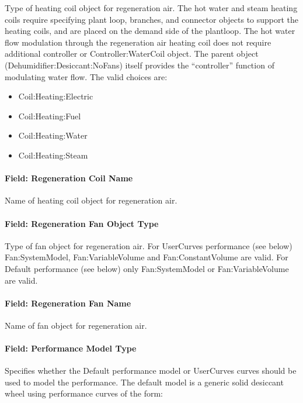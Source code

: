 Type of heating coil object for regeneration air. The hot water and steam heating coils require specifying plant loop, branches, and connector objects to support the heating coils, and are placed on the demand side of the plantloop. The hot water flow modulation through the regeneration air heating coil does not require additional controller or Controller:WaterCoil object. The parent object (Dehumidifier:Desiccant:NoFans) itself provides the ``controller'' function of modulating water flow. The valid choices are:

\begin{itemize}
\item
  Coil:Heating:Electric
\item
  Coil:Heating:Fuel
\item
  Coil:Heating:Water
\item
  Coil:Heating:Steam
\end{itemize}

\paragraph{Field: Regeneration Coil Name}\label{field-regeneration-coil-name}

Name of heating coil object for regeneration air.

\paragraph{Field: Regeneration Fan Object Type}\label{field-regeneration-fan-object-type}

Type of fan object for regeneration air. For UserCurves performance (see below) Fan:SystemModel, Fan:VariableVolume and Fan:ConstantVolume are valid. For Default performance (see below) only Fan:SystemModel or Fan:VariableVolume are valid.

\paragraph{Field: Regeneration Fan Name}\label{field-regeneration-fan-name}

Name of fan object for regeneration air.

\paragraph{Field: Performance Model Type}\label{field-performance-model-type}

Specifies whether the Default performance model or UserCurves curves should be used to model the performance. The default model is a generic solid desiccant wheel using performance curves of the form:

